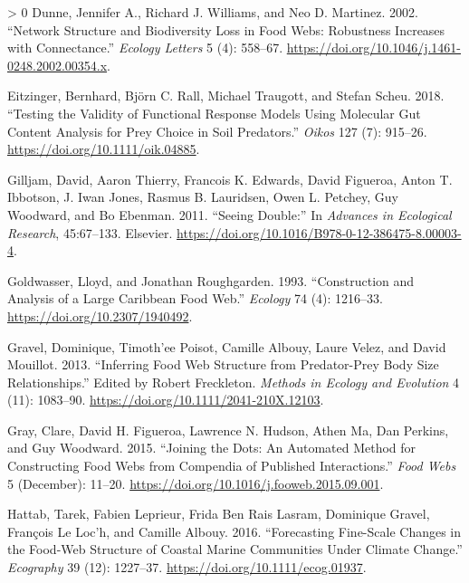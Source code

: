 \documentclass{article}
\newlength{\cslhangindent}
\newenvironment{CSLReferences}[3] %
 {%
  \setlength{\parindent}{0pt}
  \ifodd #1 \everypar{\setlength{\hangindent}{\cslhangindent}}\ignorespaces\fi
  \ifnum #2 > 0
  \setlength{\parskip}{#2\baselineskip}
  \fi
 }%
 {}
\begin{document}
\begin{CSLReferences}{1}{0}
\leavevmode\hypertarget{ref-dunneNetworkStructureBiodiversity2002}{}%
Dunne, Jennifer A., Richard J. Williams, and Neo D. Martinez. 2002.
{``Network Structure and Biodiversity Loss in Food Webs: Robustness
Increases with Connectance.''} \emph{Ecology Letters} 5 (4): 558--67.
\url{https://doi.org/10.1046/j.1461-0248.2002.00354.x}.

\leavevmode\hypertarget{ref-eitzingerTestingValidityFunctional2018}{}%
Eitzinger, Bernhard, Björn C. Rall, Michael Traugott, and Stefan Scheu.
2018. {``Testing the Validity of Functional Response Models Using
Molecular Gut Content Analysis for Prey Choice in Soil Predators.''}
\emph{Oikos} 127 (7): 915--26. \url{https://doi.org/10.1111/oik.04885}.

\leavevmode\hypertarget{ref-gilljamSeeingDouble2011}{}%
Gilljam, David, Aaron Thierry, Francois K. Edwards, David Figueroa,
Anton T. Ibbotson, J. Iwan Jones, Rasmus B. Lauridsen, Owen L. Petchey,
Guy Woodward, and Bo Ebenman. 2011. {``Seeing {Double}:''} In
\emph{Advances in {Ecological Research}}, 45:67--133. {Elsevier}.
\url{https://doi.org/10.1016/B978-0-12-386475-8.00003-4}.

\leavevmode\hypertarget{ref-goldwasserConstructionAnalysisLarge1993a}{}%
Goldwasser, Lloyd, and Jonathan Roughgarden. 1993. {``Construction and
{Analysis} of a {Large Caribbean Food Web}.''} \emph{Ecology} 74 (4):
1216--33. \url{https://doi.org/10.2307/1940492}.

\leavevmode\hypertarget{ref-gravelInferringFoodWeb2013}{}%
Gravel, Dominique, Timoth'ee Poisot, Camille Albouy, Laure Velez, and
David Mouillot. 2013. {``Inferring Food Web Structure from Predator-Prey
Body Size Relationships.''} Edited by Robert Freckleton. \emph{Methods
in Ecology and Evolution} 4 (11): 1083--90.
\url{https://doi.org/10.1111/2041-210X.12103}.

\leavevmode\hypertarget{ref-grayJoiningDotsAutomated2015}{}%
Gray, Clare, David H. Figueroa, Lawrence N. Hudson, Athen Ma, Dan
Perkins, and Guy Woodward. 2015. {``Joining the Dots: {An} Automated
Method for Constructing Food Webs from Compendia of Published
Interactions.''} \emph{Food Webs} 5 (December): 11--20.
\url{https://doi.org/10.1016/j.fooweb.2015.09.001}.

\leavevmode\hypertarget{ref-hattabForecastingFinescaleChanges2016}{}%
Hattab, Tarek, Fabien Leprieur, Frida Ben Rais Lasram, Dominique Gravel,
François Le Loc'h, and Camille Albouy. 2016. {``Forecasting Fine-Scale
Changes in the Food-Web Structure of Coastal Marine Communities Under
Climate Change.''} \emph{Ecography} 39 (12): 1227--37.
\url{https://doi.org/10.1111/ecog.01937}.


\end{CSLReferences}
\end{document}
